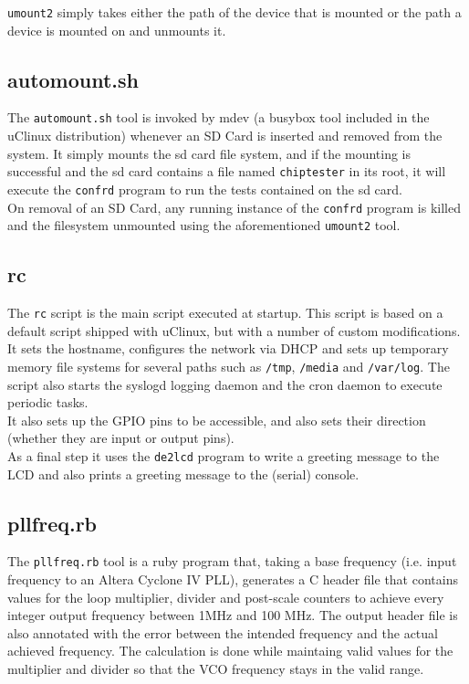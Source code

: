 \texttt{umount2} simply takes either the path of the device that is mounted or the path
a device is mounted on and unmounts it.


\subsection{automount.sh}
The \texttt{automount.sh} tool is invoked by mdev (a busybox tool included in the uClinux
distribution) whenever an SD Card is inserted and removed
from the system. It simply mounts the sd card file system, and if the mounting is
successful and the sd card contains a file named \texttt{chiptester} in its root, it
will execute the \texttt{confrd} program to run the tests contained on the sd card.
\\

On removal of an SD Card, any running instance of the \texttt{confrd} program is killed
and the filesystem unmounted using the aforementioned \texttt{umount2} tool.


\subsection{rc}
The \texttt{rc} script is the main script executed at startup. This script is based
on a default script shipped with uClinux, but with a number of custom modifications.
\\
 
It sets the hostname, configures the network via DHCP and sets up temporary memory file
systems for several paths such as \texttt{/tmp}, \texttt{/media} and \texttt{/var/log}. The
script also starts the syslogd logging daemon and the cron daemon to execute periodic tasks.
\\

It also sets up the GPIO pins to be accessible, and also sets their direction (whether
they are input or output pins).
\\

As a final step it uses the \texttt{de2lcd} program to write a greeting message to the LCD
and also prints a greeting message to the (serial) console.


\subsection{pllfreq.rb}
The \texttt{pllfreq.rb} tool is a ruby program that, taking a base frequency (i.e. input
frequency to an Altera Cyclone IV PLL), generates a C header file that contains values
for the loop multiplier, divider and post-scale counters to achieve every integer
output frequency between 1MHz and 100 MHz. The output header file is also annotated with the
error between the intended frequency and the actual achieved frequency. The calculation
is done while maintaing valid values for the multiplier and divider so that the VCO
frequency stays in the valid range.
\\

